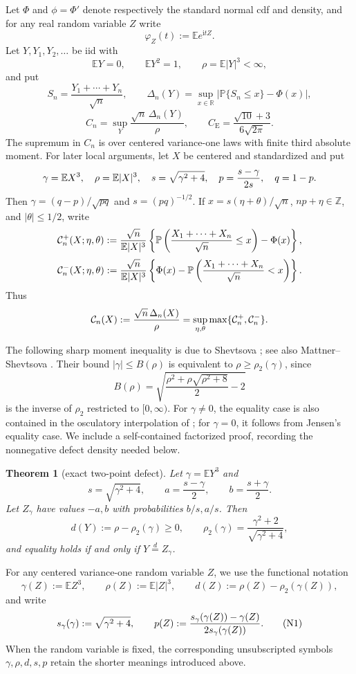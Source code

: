 \documentclass[11pt,a4paper]{article}
\numberwithin{equation}{section}
\newtheorem{theorem}{Theorem}[section]
\theoremstyle{definition}
\theoremstyle{remark}
\newcommand{\E}{\mathbb E}
\newcommand{\Pp}{\mathbb P}
\newcommand{\R}{\mathbb R}
\newcommand{\ii}{\mathrm i}
\newcommand{\CE}{C_{\mathrm E}}
\newcommand{\Dn}{\Delta_n}
\begin{document}
Let \(\Phi\) and \(\phi=\Phi'\) denote respectively the standard normal
cdf and density, and for any real random variable \(Z\) write
\[
                 \varphi_Z(t):=\E e^{\ii tZ}.
\]
Let $Y,Y_1,Y_2,\ldots$ be iid with
\[
  \E Y=0,\qquad \E Y^2=1,\qquad \rho=\E|Y|^3<\infty,
\]
and put
\[
  S_n=\frac{Y_1+\cdots+Y_n}{\sqrt n},\qquad
  \Dn(Y)=\sup_{x\in\R}|\Pp\{S_n\le x\}-\Phi(x)|,
\]
\[
 C_n=\sup_Y\frac{\sqrt n\,\Dn(Y)}{\rho},\qquad
 \CE=\frac{\sqrt{10}+3}{6\sqrt{2\pi}}.
\]
The supremum in $C_n$ is over centered variance-one laws with finite third
absolute moment.
For later local arguments, let $X$ be centered and standardized and put
\[
 \gamma=\E X^3,\quad \rho=\E|X|^3,\quad
 s=\sqrt{\gamma^2+4},\quad
 p={s-\gamma\over2s},\quad q=1-p.
\]
Then $\gamma=(q-p)/\sqrt{pq}$ and $s=(pq)^{-1/2}$.  If
$x=s(\eta+\theta)/\sqrt n$, $np+\eta\in\mathbb Z$, and
$|\theta|\le1/2$, write
\[
 \mathcal C_n^+(X;\eta,\theta)
 := {\sqrt n\over\E|X|^3}\left\{
 \Pp\left({X_1+\cdots+X_n\over\sqrt n}\le x\right)-\Phi(x)\right\},
\]
\[
 \mathcal C_n^-(X;\eta,\theta)
 := {\sqrt n\over\E|X|^3}\left\{
 \Phi(x)-\Pp\left({X_1+\cdots+X_n\over\sqrt n}<x\right)\right\}.
\]
Thus
\[
 \mathcal C_n(X):={\sqrt n\,\Delta_n(X)\over\rho}
 =\sup_{\eta,\theta}\max\{\mathcal C_n^+,\mathcal C_n^-\}.
\]

The following sharp moment inequality is due to Shevtsova
\cite[Theorem~6]{Shevtsova2014}; see also
Mattner--Shevtsova \cite[Example~1.3]{MattnerShevtsova2019}.
Their bound $|\gamma|\le B(\rho)$ is equivalent to
$\rho\ge\rho_2(\gamma)$, since
\[
 B(\rho)=\sqrt{\frac{\rho^2+\rho\sqrt{\rho^2+8}}2-2}
\]
is the inverse of $\rho_2$ restricted to $[0,\infty)$.
For $\gamma\ne0$, the equality case is also contained in the osculatory
interpolation of \cite[Lemma~2.4(b)]{MattnerShevtsova2019}; for
$\gamma=0$, it follows from Jensen's equality case.
We include a self-contained factorized proof, recording the
nonnegative defect density needed below.

\begin{theorem}[exact two-point defect]\label{orig:thm:defect}
Let $\gamma=\E Y^3$ and
\[
 s=\sqrt{\gamma^2+4},\qquad
 a=\frac{s-\gamma}{2},\qquad b=\frac{s+\gamma}{2}.
\]
Let $Z_\gamma$ have values $-a,b$ with probabilities $b/s,a/s$.
Then
\[
 d(Y):=\rho-\rho_2(\gamma)\ge0,\qquad
 \rho_2(\gamma)=\frac{\gamma^2+2}{\sqrt{\gamma^2+4}},
\]
and equality holds if and only if $Y\stackrel d=Z_\gamma$.
\end{theorem}

For any centered variance-one random variable \(Z\), we use the functional
notation
\[
 \gamma(Z):=\E Z^3,\qquad \rho(Z):=\E|Z|^3,\qquad
 d(Z):=\rho(Z)-\rho_2(\gamma(Z)),                       \tag{N0}
\]
and write
\[
 s_\gamma(\gamma):=\sqrt{\gamma^2+4},\qquad
 p(Z):={s_\gamma(\gamma(Z))-\gamma(Z)\over
              2s_\gamma(\gamma(Z))}.
                                                               \tag{N1}
\]
When the random variable is fixed, the corresponding unsubscripted symbols
\(\gamma,\rho,d,s,p\) retain the shorter meanings introduced above.
\end{document}
